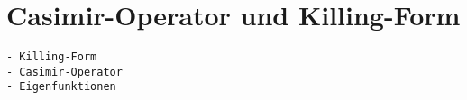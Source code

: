 %
%
%
\section{Casimir-Operator und Killing-Form
\label{buch:operatoren:section:casimir}}

\begin{verbatim}
- Killing-Form
- Casimir-Operator
- Eigenfunktionen
\end{verbatim}
